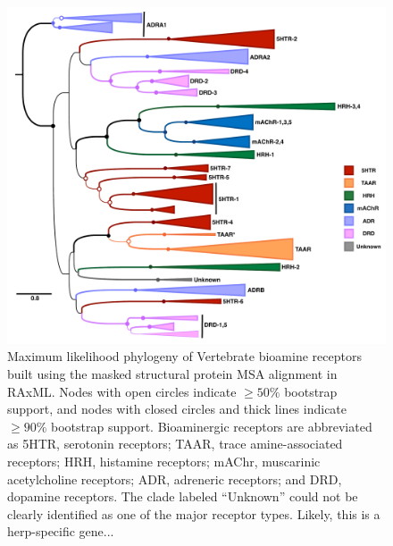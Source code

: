 \documentclass[fleqn,10pt]{wlpeerj}
\begin{document}
\begin{figure}[htbp]
	\centerline{\includegraphics[width=18cm]{figures/masked_part_phylogeny.pdf}}
	\caption{\label{phylogeny} Maximum likelihood phylogeny of Vertebrate bioamine receptors built using the masked structural protein MSA alignment in RAxML. Nodes with open circles indicate $\geq 50\%$ bootstrap support, and nodes with closed circles and thick lines indicate $\geq 90\%$ bootstrap support. Bioaminergic receptors are abbreviated as 5HTR, serotonin receptors; TAAR, trace amine-associated receptors; HRH, histamine receptors; mAChr, muscarinic acetylcholine receptors; ADR, adreneric receptors; and DRD, dopamine receptors. The clade labeled ``Unknown'' could not be clearly identified as one of the major receptor types. Likely, this is a herp-specific gene...}
\end{figure}
\end{document}
